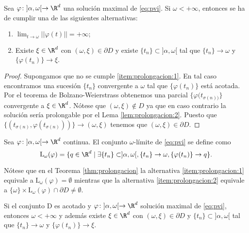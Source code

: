 \documentclass{article}
\begin{document}
\begin{theorem}
  \label{thm:prolongacion}
  Sea $\varphi \colon ]\alpha, \omega[ \to \R^d$ una solución maximal de \eqref{eq:pvi}. Si
  $\omega < +\infty$, entonces se ha de cumplir una de las siguientes alternativas:
  \begin{enumerate}
  \item\label{item:prolongacion:1} $\lim_{t \to \omega} ||\varphi(t)|| = +\infty$;
  \item\label{item:prolongacion:2} Existe $\xi \in \R^d$ con $(\omega, \xi) \in \partial D$ y existe
    $\{t_n\} \subset ]\alpha, \omega[$ tal que $\{t_n\} \to \omega$ y $\{\varphi(t_n)\} \to \xi$.
  \end{enumerate}
\end{theorem}
\begin{proof}
  Supongamos que no se cumple \ref{item:prolongacion:1}. En tal caso encontramos una sucesión
  $\{t_n\}$ convergente a $\omega$ tal que $\{\varphi(t_n)\}$ está acotada. Por el teorema de
  Bolzano-Weierstrass obtenemos una parcial $\{\varphi(t_{\sigma(n))}\}$ convergente a
  $\xi \in \R^d$. Nótese que $(\omega, \xi) \not \in D$ ya que en caso contrario la solución sería
  prolongable por el Lema \ref{lem:prolongacion:2}. Puesto que
  $\{(t_{\sigma(n)}, \varphi(t_{\sigma(n)}))\} \to (\omega, \xi)$ tenemos que
  $(\omega, \xi) \in \partial D$.
\end{proof}

\begin{definition}
  Sea $\varphi \colon ]\alpha, \omega[ \to \R^d$ continua. El conjunto $\omega$-límite de
  \eqref{eq:pvi} se define como
  \[\mathrm{L}_{\omega}(\varphi) = \{q \in \R^d \mid \exists \{t_n\} \subset ]\alpha, \omega[,
    \{t_n\} \to \omega, \{\varphi(t_n)\} \to q\}.\]
\end{definition}

\begin{remark}
  Nótese que en el Teorema \ref{thm:prolongacion} la alternativa \ref{item:prolongacion:1} equivale
  a $\mathrm{L}_{\omega}(\varphi) = \emptyset$ mientras que la alternativa \ref{item:prolongacion:2}
  equivale a $\{\omega\} \times \mathrm{L}_{\omega}(\varphi) \cap \partial D \ne \emptyset$.
\end{remark}

\begin{corollary}
  Si el conjunto D es acotado y $\varphi \colon ]\alpha, \omega[ \to \R^d$ solución maximal de
  \eqref{eq:pvi}, entonces $\omega < +\infty$ y además existe $\xi \in \R^d$ con
  $(\omega, \xi) \in \partial D$ y $\{t_n\} \subset ]\alpha, \omega[$ tal que $\{t_n\} \to \omega$ y
  $\{\varphi(t_n)\} \to \xi$.
\end{corollary}
\end{document}
